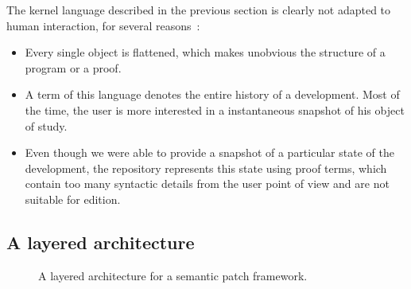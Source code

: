 \documentclass{article}
\newcommand{\remplan}[1]{}
\newcommand{\remtext}[1]{}
\begin{document}
\remplan{Fri Jun 18, 2010 10:50 AM. L'objectif ici, c'est de décrire
  une (possible) architecture pour rendre utilisable le langage 
  décrit dans la section précédente. En gros, on énumère les 
  opérations qui interviennent dans l'utilisation et on les décrit
  informellement à l'aide d'un exemple.}

The kernel language described in the previous section is clearly not
adapted to human interaction, for several reasons~: 
\begin{itemize}

\item Every single object is flattened, which makes unobvious the
  structure of a program or a proof. 

\item A term of this language denotes the entire history of a
  development. Most of the time, the user is more interested in a
  instantaneous snapshot of his object of study.

\item Even though we were able to provide a snapshot of a particular
  state of the development, the repository represents this state 
  using proof terms, which contain too many syntactic details from the
  user point of view and are not suitable for edition.  

\end{itemize}

\remtext{Fri Jun 18, 2010 10:52 AM. Par contre, je ne sais pas quel
  exemple utilisé. Le STLC? Est-ce que ça fait ``assez'' système
  logique pour ce workshop?}

\subsection{A layered architecture}

\remtext{Fri Jun 18, 2010  1:32 PM. Ici, on décrit la figure en suivant
  le modèle de flot du système. On décrit le rôle des fonctions, 
les problèmes posés.}

\begin{figure}
\begin{center}
\end{center}
\label{fig:architecture}
\caption{A layered architecture for a semantic patch framework.}
\end{figure}
\end{document}
